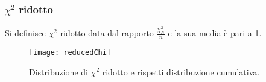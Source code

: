 \documentclass[11pt,a4paper]{book}
\begin{document}
\subsubsection{$\chi^2$ ridotto}

Si definisce $\chi^2$ ridotto data dal rapporto $\frac{\chi^2_N}{n}$ e la sua media \`{e} pari a 1.

 
\begin{figure}[ht]
\vspace{0.in}
\texttt{[image: reducedChi]}	
\centering
\vspace{0.in}
\caption{Distribuzione di $\chi^2$ ridotto e rispetti distribuzione cumulativa.}
\end{figure}
\end{document}
